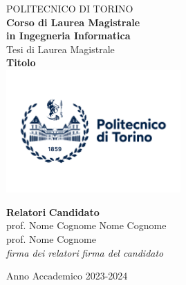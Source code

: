 \begin{titlepage}
    
    \begin{center}
    
    {\huge POLITECNICO DI TORINO}\\[1.5cm]
    \textbf{Corso di Laurea Magistrale\\in Ingegneria Informatica}\\[3cm]
    
    {\Large Tesi di Laurea Magistrale}\\[0.5cm]
    \textbf{\LARGE Titolo }\\[2cm]
    \includegraphics[width=0.5\textwidth]{./images/logo/logoPoliTo_with_name_2021.jpg}
    \vspace{2cm}
    
    
    \begin{minipage}{0.85\textwidth}
    \begin{flushleft}\large
    \textbf{Relatori} \hfill \textbf{Candidato}\\
    prof. Nome Cognome \hfill Nome Cognome\\
    prof. Nome Cognome \\
    \textit{firma dei relatori} \hfill \textit{firma del candidato}\\[0.35cm]
    \end{flushleft}
    \end{minipage}
    
    \vfill
    
    Anno Accademico 2023-2024
    \end{center}
    
    \restoregeometry %
    
    \end{titlepage}